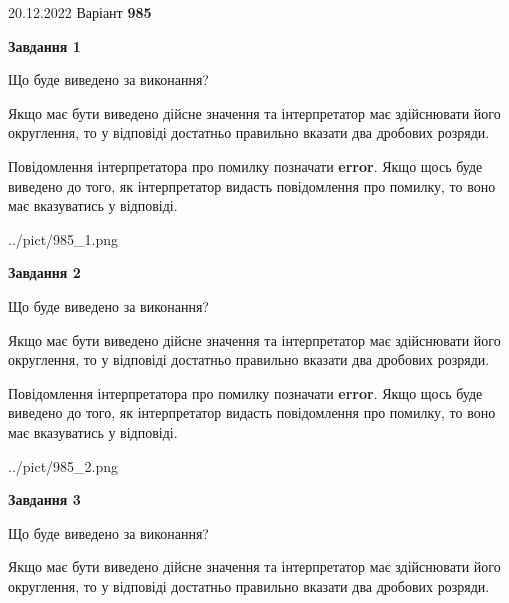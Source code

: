 \documentclass[12pt, ukrainian]{article}
\begin{document}
{20.12.2022 Варіант \No \textbf { 985 }\par}
{
\begin {Large}

{\begin {center}\textbf{Завдання 1}\end {center}}\par
Що буде виведено за виконання? \par

Якщо має бути виведено дійсне значення та інтерпретатор має здійснювати його округлення, 
то у відповіді достатньо правильно вказати два дробових розряди.

Повідомлення інтерпретатора про помилку позначати \textbf{error}.
Якщо щось буде виведено до того, як інтерпретатор видасть повідомлення про помилку, 
то воно має вказуватись у відповіді. \par

\begin{center}
	{../pict/985_1.png}
\end{center}
\newpage

{\begin {center}\textbf{Завдання 2}\end {center}}\par
Що буде виведено за виконання? \par

Якщо має бути виведено дійсне значення та інтерпретатор має здійснювати його округлення, 
то у відповіді достатньо правильно вказати два дробових розряди.

Повідомлення інтерпретатора про помилку позначати \textbf{error}.
Якщо щось буде виведено до того, як інтерпретатор видасть повідомлення про помилку, 
то воно має вказуватись у відповіді. \par

\begin{center}
	{../pict/985_2.png}
\end{center}
\newpage

{\begin {center}\textbf{Завдання 3}\end {center}}\par
Що буде виведено за виконання? \par

Якщо має бути виведено дійсне значення та інтерпретатор має здійснювати його округлення, 
то у відповіді достатньо правильно вказати два дробових розряди.


\end{Large}}
\end{document}
